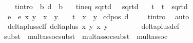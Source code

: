 \begin{isabellebody}
\ \ \ t{\isacharunderscore}intro{\isacharcolon}\ {\isachardoublequoteopen}{\isasymexists}\ b{\isacharprime}{\isachardot}\ d\ {\isacharequal}\ {\isacharparenleft}b{\isacharprime}{\isacharparenright}{\isacharcircum}{}{\isachardoublequoteclose}\isanewline
\ \ \ t{\isacharunderscore}ineq{\isacharcolon}\ {\isachardoublequoteopen}sqrt{\isacharparenleft}d{\isacharparenright}{\isacharcircum}{}\ {\isasymnoteq}\ {}{\isachardoublequoteclose}\ {\isachardoublequoteopen}sqrt{\isacharparenleft}d{\isacharparenright}\ {\isasymnoteq}\ {}{\isachardoublequoteclose}\isanewline
{}\isanewline
\isanewline
{}\isamarkupfalse%
\ t\ \ {\isachardoublequoteopen}t\ {\isacharequal}\ sqrt{\isacharparenleft}d{\isacharparenright}{\isachardoublequoteclose}\isanewline
{}\isamarkupfalse%
\ e{\isacharprime}\ \ {\isachardoublequoteopen}e{\isacharprime}\ x\ y\ {\isacharequal}\ x{\isacharcircum}{}\ {\isacharplus}\ y{\isacharcircum}{}\ {\isacharminus}\ {}\ {\isacharminus}\ t{\isacharcircum}{}\ {\isacharasterisk}\ x{\isacharcircum}{}\ {\isacharasterisk}\ y{\isacharcircum}{}{\isachardoublequoteclose}\isanewline
\isanewline
{}\isamarkupfalse%
\ c{\isacharunderscore}d{\isacharunderscore}pos{\isacharcolon}\ {\isachardoublequoteopen}d\ {\isasymge}\ {}{\isachardoublequoteclose}%
\isadelimproof
\ %
\endisadelimproof
%
\isatagproof
{}\isamarkupfalse%
\ t{\isacharunderscore}intro\ \isamarkupfalse%
\ auto%
\endisatagproof
{\isafoldproof}%
%
\isadelimproof
%
\endisadelimproof
\isanewline
\isanewline
{}\isamarkupfalse%
\ delta{\isacharunderscore}plus{\isacharunderscore}self{\isacharcolon}\ {\isachardoublequoteopen}delta{\isacharunderscore}plus\ x{}\ y{}\ x{}\ y{}\ {\isasymnoteq}\ {}{\isachardoublequoteclose}\ \isanewline
%
\isadelimproof
\ \ \ \ %
\endisadelimproof
%
\isatagproof
{}\isamarkupfalse%
\ delta{\isacharunderscore}plus{\isacharunderscore}def\isanewline
\ \ \ \ \isamarkupfalse%
{\isacharparenleft}subst\ {\isacharparenleft}{}{\isacharparenright}\ mult{\isachardot}assoc{\isacharcomma}subst\ {\isacharparenleft}{}{\isacharparenright}\ mult{\isachardot}assoc{\isacharcomma}subst\ {\isacharparenleft}{}{\isacharparenright}\ mult{\isachardot}assoc{\isacharparenright}\isanewline

\end{isabellebody}

